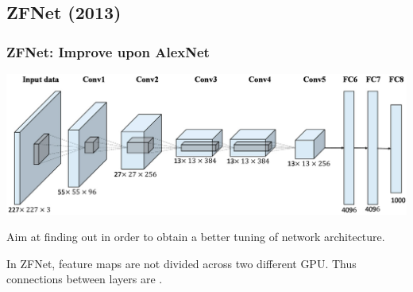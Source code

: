\subsection{ZFNet (2013)}

\begin{frame}
	\frametitle{ZFNet: Improve upon AlexNet}
	
	
	\bigskip
	
	\begin{center}
		\includegraphics[scale=0.6]{figs/AlexNet}
	\end{center}

	\bigskip

	Aim at finding out  in order to obtain a better tuning of network architecture. 
	
	\bigskip
	
	In ZFNet, feature maps are not divided across two different GPU. Thus connections between layers are . 
\end{frame}

